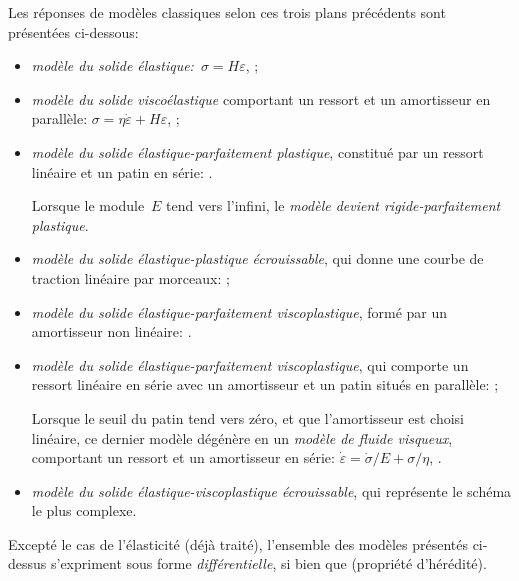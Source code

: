 \medskipvm
Les réponses de modèles classiques selon ces trois plans précédents sont présentées ci-dessous:
\begin{itemize}
  \item \emph{modèle du solide élastique:}~$\sigma = H \varepsilon$, ;
  \item \emph{modèle du solide viscoélastique} comportant un ressort et un amortisseur en parallèle:
	$\sigma=\eta\dot{\varepsilon}+H\varepsilon$, ;
  \item \emph{modèle du solide élastique-parfaitement plastique}, constitué par un ressort linéaire et un patin en série: .

	Lorsque le module~$E$ tend vers l'infini, le \emph{modèle devient rigide-parfaitement plastique}.
  \item \emph{modèle du solide élastique-plastique écrouissable}, qui donne une courbe de traction
	linéaire par morceaux: ;
  \item \emph{modèle du solide élastique-parfaitement viscoplastique}, formé par un amortisseur non linéaire:
	.
\item \emph{modèle du solide élastique-parfaitement viscoplastique}, qui comporte un ressort linéaire en série
	avec un amortisseur et un patin situés en parallèle: ;

	Lorsque le seuil du patin tend vers zéro, et que l'amortisseur est choisi linéaire, ce dernier modèle dégénère en un \emph{modèle de fluide visqueux}, comportant un ressort et un amortisseur en série:
	$\dot{\varepsilon}=\dot{\sigma}/E+\sigma/\eta$, .
  \item \emph{modèle du solide élastique-viscoplastique écrouissable}, qui représente le schéma le plus complexe.
\end{itemize}
\medskipvm
Excepté le cas de l'élasticité (déjà traité), l'ensemble des modèles présentés ci-dessus s'expriment sous forme \emph{différentielle}, si bien que  (propriété d'hérédité).

